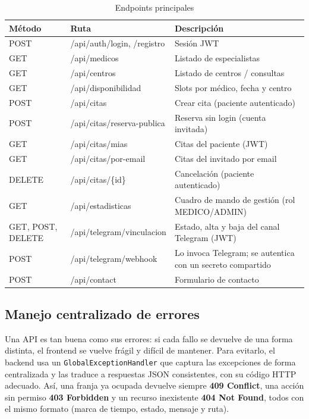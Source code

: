 \documentclass[12pt,a4paper]{report}
\begin{document}
\begin{table}[H]
\centering
\small
\begin{tabular}{llp{6.2cm}}
\toprule
\textbf{Método} & \textbf{Ruta} & \textbf{Descripción} \\
\midrule
POST & /api/auth/login, /registro & Sesión JWT \\
GET & /api/medicos & Listado de especialistas \\
GET & /api/centros & Listado de centros / consultas \\
GET & /api/disponibilidad & Slots por médico, fecha y centro \\
POST & /api/citas & Crear cita (paciente autenticado) \\
POST & /api/citas/reserva-publica & Reserva sin login (cuenta invitada) \\
GET & /api/citas/mias & Citas del paciente (JWT) \\
GET & /api/citas/por-email & Citas del invitado por email \\
DELETE & /api/citas/\{id\} & Cancelación (paciente autenticado) \\
GET & /api/estadisticas & Cuadro de mando de gestión (rol MEDICO/ADMIN) \\
GET, POST, DELETE & /api/telegram/vinculacion & Estado, alta y baja del canal Telegram (JWT) \\
POST & /api/telegram/webhook & Lo invoca Telegram; se autentica con un secreto compartido \\
POST & /api/contact & Formulario de contacto \\
\bottomrule
\end{tabular}
\caption{Endpoints principales}
\end{table}

\subsection{Manejo centralizado de errores}

Una API es tan buena como sus errores: si cada fallo se devuelve de una forma distinta, el frontend se vuelve frágil y difícil de mantener. Para evitarlo, el backend usa un \texttt{GlobalExceptionHandler} que captura las excepciones de forma centralizada y las traduce a respuestas JSON consistentes, con su código HTTP adecuado. Así, una franja ya ocupada devuelve siempre \textbf{409 Conflict}, una acción sin permiso \textbf{403 Forbidden} y un recurso inexistente \textbf{404 Not Found}, todos con el mismo formato (marca de tiempo, estado, mensaje y ruta).
\end{document}
